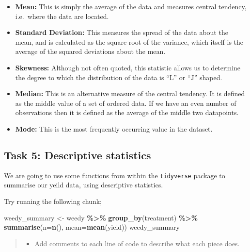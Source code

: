 \documentclass[
]{book}
\newenvironment{Shaded}{\begin{snugshade}}{\end{snugshade}}
\newcommand{\AttributeTok}[1]{\textcolor[rgb]{0.13,0.29,0.53}{#1}}
\newcommand{\FunctionTok}[1]{\textcolor[rgb]{0.13,0.29,0.53}{\textbf{#1}}}
\newcommand{\NormalTok}[1]{#1}
\newcommand{\OtherTok}[1]{\textcolor[rgb]{0.56,0.35,0.01}{#1}}
\newcommand{\SpecialCharTok}[1]{\textcolor[rgb]{0.81,0.36,0.00}{\textbf{#1}}}
\providecommand{\tightlist}{%
  \setlength{\itemsep}{0pt}\setlength{\parskip}{0pt}}
\begin{document}
\begin{itemize}
\tightlist
\item
  \textbf{Mean:} This is simply the average of the data and measures central tendency, i.e.~where the data are located.
\item
  \textbf{Standard Deviation:} This measures the spread of the data about the mean, and is calculated as the square root of the variance, which itself is the average of the squared deviations about the mean.
\item
  \textbf{Skewness:} Although not often quoted, this statistic allows us to determine the degree to which the distribution of the data is ``L'' or ``J'' shaped.
\item
  \textbf{Median:} This is an alternative measure of the central tendency. It is defined as the middle value of a set of ordered data. If we have an even number of observations then it is defined as the average of the middle two datapoints.
\item
  \textbf{Mode:} This is the most frequently occurring value in the dataset.
\end{itemize}

\hypertarget{descriptive-statistics}{%
\subsection{Task 5: Descriptive statistics}\label{descriptive-statistics}}

We are going to use some functions from within the \texttt{tidyverse} package to summarise our yeild data, using descriptive statistics.

Try running the following chunk;

\begin{Shaded}
\begin{Highlighting}[]
\NormalTok{weedy\_summary }\OtherTok{\textless{}{-}}\NormalTok{ weedy }\SpecialCharTok{\%\textgreater{}\%} 
  \FunctionTok{group\_by}\NormalTok{(treatment) }\SpecialCharTok{\%\textgreater{}\%} 
  \FunctionTok{summarise}\NormalTok{(}\AttributeTok{n=}\FunctionTok{n}\NormalTok{(),}
            \AttributeTok{mean=}\FunctionTok{mean}\NormalTok{(yield))}
\NormalTok{weedy\_summary}
\end{Highlighting}
\end{Shaded}

\begin{quote}
\begin{itemize}
\tightlist
\item
  Add comments to each line of code to describe what each piece does.
\end{itemize}
\end{quote}
\end{document}
